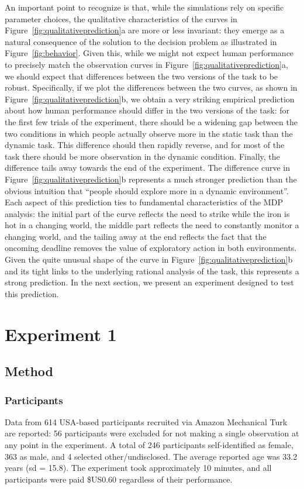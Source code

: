 \documentclass[authoryear]{elsarticle}
\newcommand{\sectionX}[1]{\section{#1}}
\newcommand{\subsectionX}[1]{\subsection{#1}}
\newcommand{\subsubsectionX}[1]{\subsubsection{#1}}
\begin{document}
An important point to recognize is that, while the simulations rely on specific parameter choices, the qualitative characteristics of the curves in Figure~\ref{fig:qualitativeprediction}a are more or less invariant: they emerge as a natural consequence of the solution to the decision problem as illustrated in Figure~\ref{fig:behavior}. Given this, while we might not expect human performance to precisely match the observation curves in Figure~\ref{fig:qualitativeprediction}a, we should expect that differences between the two versions of the task to be robust. Specifically, if we plot the differences between the two curves, as shown in Figure~\ref{fig:qualitativeprediction}b, we obtain a very striking empirical prediction about how human performance should differ in the two versions of the task: for the first few trials of the experiment, there should be a widening gap between the two conditions in which people actually observe more in the static task than the dynamic task. This difference should then rapidly reverse, and for most of the task there should be more observation in the dynamic condition. Finally, the difference tails away towards the end of the experiment. The difference curve in Figure~\ref{fig:qualitativeprediction}b represents a much stronger prediction than the obvious intuition that ``people should explore more in a dynamic environment''. Each aspect of this prediction ties to fundamental characteristics of the MDP analysis: the initial part of the curve reflects the need to strike while the iron is hot in a changing world, the middle part reflects the need to constantly monitor a changing world, and the tailing away at the end reflects the fact that the oncoming deadline removes the value of exploratory action in both environments. Given the quite unusual shape of the curve in Figure~\ref{fig:qualitativeprediction}b and its tight links to the underlying rational analysis of the task, this represents a strong prediction. In the next section, we present an experiment designed to test this prediction.




\sectionX{Experiment 1}

\subsectionX{Method}

\subsubsectionX{Participants} Data from 614 USA-based participants recruited via Amazon Mechanical Turk are reported: 56 participants were excluded for not making a single observation at any point in the experiment. A total of 246 participants self-identified as female, 363 as male, and 4 selected other/undisclosed. The average reported age was 33.2 years (sd = 15.8). The experiment took approximately 10 minutes, and all participants were paid \$US0.60 regardless of their performance.
\end{document}
